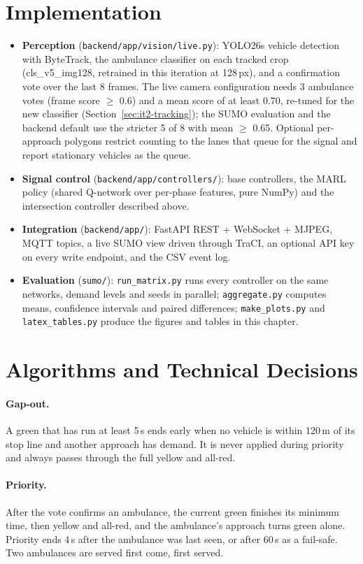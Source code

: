 \section{Implementation}
\begin{itemize}
\item \textbf{Perception} (\texttt{backend/app/vision/live.py}): YOLO26s vehicle detection with ByteTrack,
the ambulance classifier on each tracked crop (cls\_v5\_img128, retrained in this iteration at 128\,px), and a
confirmation vote over the last 8 frames. The live camera configuration needs 3 ambulance votes (frame score
$\geq$ 0.6) and a mean score of at least 0.70, re-tuned for the new classifier
(Section~\ref{sec:it2-tracking}); the SUMO evaluation and the backend default use the stricter 5 of 8 with mean
$\geq$ 0.65. Optional per-approach polygons restrict counting to the lanes that queue for the signal and
report stationary vehicles as the queue.
\item \textbf{Signal control} (\texttt{backend/app/controllers/}): base controllers, the MARL policy
(shared Q-network over per-phase features, pure NumPy) and the intersection controller described above.
\item \textbf{Integration} (\texttt{backend/app/}): FastAPI REST + WebSocket + MJPEG, MQTT topics, a live
SUMO view driven through TraCI, an optional API key on every write endpoint, and the CSV event log.
\item \textbf{Evaluation} (\texttt{sumo/}): \texttt{run\_matrix.py} runs every controller on the same
networks, demand levels and seeds in parallel; \texttt{aggregate.py} computes means, confidence intervals and
paired differences; \texttt{make\_plots.py} and \texttt{latex\_tables.py} produce the figures and tables in
this chapter.
\end{itemize}

\section{Algorithms and Technical Decisions}
\paragraph{Gap-out.} A green that has run at least 5\,s ends early when no vehicle is within 120\,m of its
stop line and another approach has demand. It is never applied during priority and always passes through
the full yellow and all-red.
\paragraph{Priority.} After the vote confirms an ambulance, the current green finishes its minimum time,
then yellow and all-red, and the ambulance's approach turns green alone. Priority ends 4\,s after the
ambulance was last seen, or after 60\,s as a fail-safe. Two ambulances are served first come, first served.
